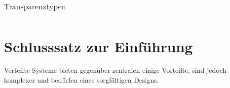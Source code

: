 \begin{description}
\begin{table}[h]
\begin{tabular}{ l |  p{11cm} }
			\end{tabular}
			\caption{Transparenztypen}
			\label{table:transparenztypen}
		\end{table}
\end{description}


 
\section{Schlusssatz zur Einführung}
Verteilte Systeme bieten gegenüber zentralen einige Vorteilte, sind jedoch komplexer und bedürfen eines sorgfältigen Designs.
